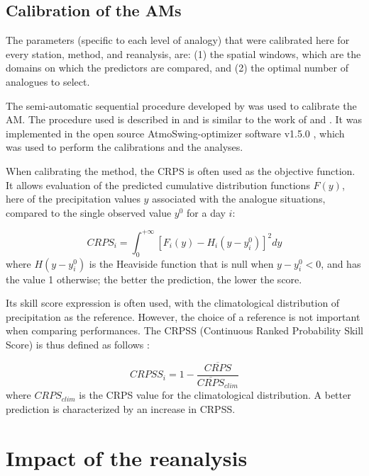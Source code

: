 \documentclass[smallextended]{svjour3}       %
\begin{document}
	
	\subsection{Calibration of the AMs}
	\label{sec:calibration}
	
	The parameters (specific to each level of analogy) that were calibrated here for every station, method, and reanalysis, are: (1) the spatial windows, which are the domains on which the predictors are compared, and (2) the optimal number of analogues to select.
	
	The semi-automatic sequential procedure developed by \citet{Bontron2004} was used to calibrate the AM. The procedure used is described in \citet{Horton2017c} and is similar to the work of \citet{Radanovics2013} and \citet{BenDaoud2016}. It was implemented in the open source AtmoSwing-optimizer software v1.5.0 \citep[www.atmoswing.org,][]{Horton2017a}, which was used to perform the calibrations and the analyses.
	
	When calibrating the method, the CRPS \citep[Continuous Ranked Probability Score,][]{Brown1974, Matheson1976, Hersbach2000} is often used as the objective function. It allows evaluation of the predicted cumulative distribution functions $F(y)$, here of the precipitation values $y$ associated with the analogue situations, compared to the single observed value $y^{0}$ for a day $i$:
	
	\begin{equation}
	\label{eq:CRPS}
	CRPS_{i} = \int_{0}^{+\infty} \left[ F_{i}(y)-H_{i}(y-y_{i}^{0})\right]^{2} dy
	\end{equation}
	where $H(y-y_{i}^{0})$ is the Heaviside function that is null when $y-y_{i}^{0}<0$, and has the value 1 otherwise; the better the prediction, the lower the score.
	
	Its skill score expression is often used, with the climatological distribution of precipitation as the reference. However, the choice of a reference is not important when comparing performances. The CRPSS (Continuous Ranked Probability Skill Score) is thus defined as follows \citep{Bradley2011}:
	
	\begin{equation}
	\label{eq:CRPSS}
	CRPSS_{i} = 1-\frac{\overline{CRPS}}{\overline{CRPS}_{clim}}
	\end{equation}
	where $CRPS_{clim}$ is the CRPS value for the climatological distribution. A better prediction is characterized by an increase in CRPSS.
	
	
	\section{Impact of the reanalysis}
	\label{sec:influence}
	
\end{document}
